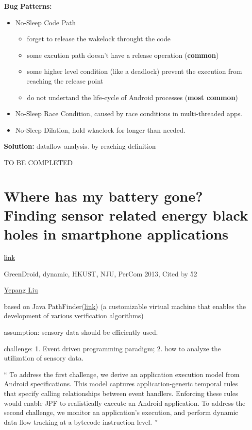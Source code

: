 \documentclass{article}
\begin{document}
\textbf{Bug Patterns:}
\begin{itemize}
\item No-Sleep Code Path
  \begin{itemize}
  \item forget to release the wakelock throught the code
  \item some excution path doesn't have a release operation (\textbf{common})
  \item some higher level condition (like a deadlock) prevent the execution from
    reaching the release point
  \item do not undertand the life-cycle of Android processes (\textbf{most
      common})
  \end{itemize}
\item No-Sleep Race Condition, caused by race conditions in multi-threaded apps.
\item No-Sleep Dilation, hold wkaelock for longer than needed.
\end{itemize}

\textbf{Solution:
}dataflow analysis. by reaching definition 

TO BE COMPLETED


\section{Where has my battery gone? Finding sensor related energy black holes in
  smartphone applications}

\href{http://ieeexplore.ieee.org/abstract/document/6526708/}{link}

GreenDroid, dynamic, HKUST, NJU, PerCom 2013, Cited by 52

\href{http://www.cse.ust.hk/~andrewust/}{Yepang Liu}

based on Java
PathFinder(\href{http://babelfish.arc.nasa.gov/trac/jpf/wiki}{link})
(a customizable virtual machine that enables the development of various
verification algorithms)

assumption: sensory data should be efficiently used.

challenge: 1. Event driven programming paradigm; 2. how to analyze the
utilization of sensory data.

`` To address the first challenge, we derive an application execution model from
Android specifications. This model captures application-generic temporal rules
that specify calling relationships between event handlers. Enforcing these rules
would enable JPF to realistically execute an Android application. To address the
second challenge, we monitor an application’s execution, and perform dynamic
data flow tracking at a bytecode instruction level. ''
\end{document}
